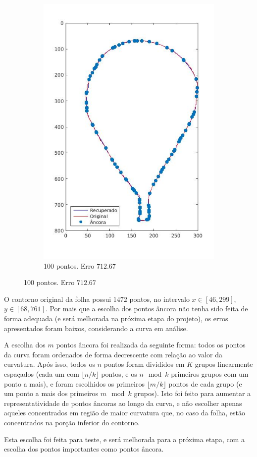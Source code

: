 \begin{figure}[ht!]
\begin{subfigure}[t]{0.31\textwidth}
		\includegraphics[width=\textwidth]{img/curv100.jpg}
		\caption{100 pontos. Erro $712.67$}
		\label{fig:ex33}
	\end{subfigure}
	\label{fig:repcurv}
\end{figure}

O contorno original da folha possui $1472$ pontos, no intervalo $x \in [46, 299]$, $y \in [68, 761]$. Por mais que a escolha dos pontos âncora não tenha sido feita de forma adequada (e será melhorada na próxima etapa do projeto), os erros apresentados foram baixos, considerando a curva em análise.

A escolha dos $m$ pontos âncora foi realizada da seguinte forma: todos os pontos da curva foram ordenados de forma decrescente com relação ao valor da curvatura. Após isso, todos os $n$ pontos foram divididos em $K$ grupos linearmente espaçados (cada um com $\lfloor n/k \rfloor$ pontos, e os $n \mod k$ primeiros grupos com um ponto a mais), e foram escolhidos os primeiros $\lfloor m/k \rfloor$ pontos de cada grupo (e um ponto a mais dos primeiros $m \mod k$ grupos). Isto foi feito para aumentar a representatividade de pontos âncoras ao longo da curva, e não escolher apenas aqueles concentrados em região de maior curvatura que, no caso da folha, estão concentrados na porção inferior do contorno.

Esta escolha foi feita para teste, e será melhorada para a próxima etapa, com a escolha dos pontos importantes como pontos âncora.